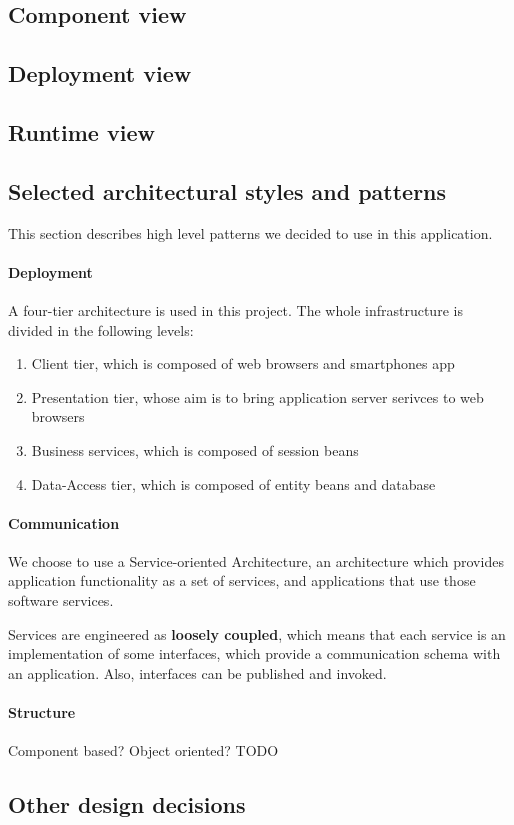 \subsection{Component view}


\subsection{Deployment view}
\label{sec:deploy}

\subsection{Runtime view}
\subsection{Selected architectural styles and patterns}
This section describes high level patterns we decided to use in this application.

\paragraph{Deployment} A four-tier architecture is used in this project.
The whole infrastructure is divided in the following levels:
\begin{enumerate}
\item{Client tier, which is composed of web browsers and smartphones app}
\item{Presentation tier, whose aim is to bring application server serivces to web browsers}
\item{Business services, which is composed of session beans }
\item{Data-Access tier, which is composed of entity beans and database}
\end{enumerate}

\paragraph{Communication} We choose to use a Service-oriented Architecture, 
an architecture which provides application functionality as a set of services, 
and applications that use those software services. 

Services are engineered as \textbf{loosely coupled}, which means that each service
is an implementation of some interfaces, which provide a communication schema with
an application.
Also, interfaces can be published and invoked.

\paragraph{Structure} Component based? Object oriented? TODO

\subsection{Other design decisions}
